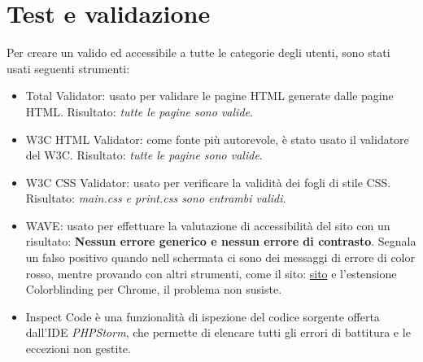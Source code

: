 \documentclass[1_relazione.tex]{subfiles}
\begin{document}
    \section{Test e validazione}\label{sec:test-e-validazione}
    Per creare un valido ed accessibile a tutte le categorie degli utenti, sono stati usati seguenti strumenti:
    \begin{itemize}
        \item{Total Validator}: usato per validare le pagine HTML generate dalle pagine HTML. Risultato: \textit{tutte le pagine sono valide}.
        \item{W3C HTML Validator}: come fonte pi\`{u} autorevole, \`{e} stato usato il validatore del W3C. Risultato: \textit{tutte le pagine sono valide}.
        \item{W3C CSS Validator}: usato per verificare la validit\`{a} dei fogli di stile CSS. Risultato: \textit{main.css e print.css sono entrambi validi}.
        \item{WAVE}: usato per effettuare la valutazione di accessibilit\`{a} del sito con un risultato: \textbf{Nessun errore generico e nessun errore di contrasto}. Segnala un falso positivo quando nell schermata ci sono dei messaggi di errore di color rosso, mentre provando con altri strumenti, come il sito: \href{https://www.color-blindness.com/coblis-color-blindness-simulator/}{sito} e l'estensione Colorblinding per Chrome, il problema non susiste. 
        \item{Inspect Code} \`{e} una funzionalit\`{a} di ispezione del codice sorgente offerta dall'IDE \textit{PHPStorm}, che permette di elencare tutti gli errori di battitura e le eccezioni non gestite.
    \end{itemize}
\end{document}
